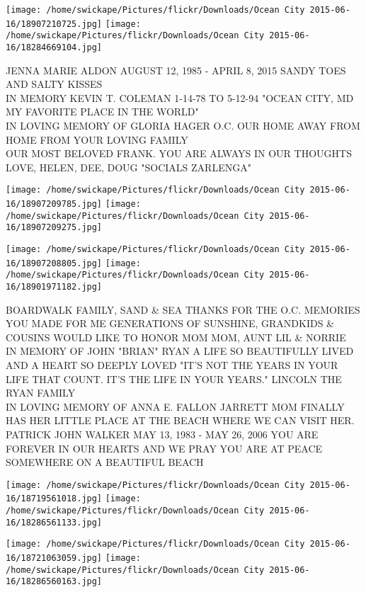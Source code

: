 \documentclass[10pt,letterpaper]{article}
\begin{document}
\texttt{[image: /home/swickape/Pictures/flickr/Downloads/Ocean City 2015-06-16/18907210725.jpg]}
\texttt{[image: /home/swickape/Pictures/flickr/Downloads/Ocean City 2015-06-16/18284669104.jpg]}

JENNA MARIE ALDON AUGUST 12, 1985 {-} APRIL 8, 2015 SANDY TOES AND SALTY KISSES\\
IN MEMORY KEVIN T. COLEMAN 1{-}14{-}78 TO 5{-}12{-}94 "OCEAN CITY, MD MY FAVORITE PLACE IN THE WORLD"\\
IN LOVING MEMORY OF GLORIA HAGER O.C. OUR HOME AWAY FROM HOME FROM YOUR LOVING FAMILY\\
OUR MOST BELOVED FRANK.  YOU ARE ALWAYS IN OUR THOUGHTS LOVE, HELEN, DEE, DOUG "SOCIALS ZARLENGA"\\
\pagebreak

\texttt{[image: /home/swickape/Pictures/flickr/Downloads/Ocean City 2015-06-16/18907209785.jpg]}
\texttt{[image: /home/swickape/Pictures/flickr/Downloads/Ocean City 2015-06-16/18907209275.jpg]}

\texttt{[image: /home/swickape/Pictures/flickr/Downloads/Ocean City 2015-06-16/18907208805.jpg]}
\texttt{[image: /home/swickape/Pictures/flickr/Downloads/Ocean City 2015-06-16/18901971182.jpg]}

BOARDWALK FAMILY, SAND \& SEA THANKS FOR THE O.C. MEMORIES YOU MADE FOR ME GENERATIONS OF SUNSHINE, GRANDKIDS \& COUSINS WOULD LIKE TO HONOR MOM MOM, AUNT LIL \& NORRIE\\
IN MEMORY OF JOHN "BRIAN" RYAN A LIFE SO BEAUTIFULLY LIVED AND A HEART SO DEEPLY LOVED "IT'S NOT THE YEARS IN YOUR LIFE THAT COUNT.  IT'S THE LIFE IN YOUR YEARS."  LINCOLN THE RYAN FAMILY\\
IN LOVING MEMORY OF ANNA E. FALLON JARRETT MOM FINALLY HAS HER LITTLE PLACE AT THE BEACH WHERE WE CAN VISIT HER.\\
PATRICK JOHN WALKER MAY 13, 1983 {-} MAY 26, 2006 YOU ARE FOREVER IN OUR HEARTS AND WE PRAY YOU ARE AT PEACE SOMEWHERE ON A BEAUTIFUL BEACH\\
\pagebreak

\texttt{[image: /home/swickape/Pictures/flickr/Downloads/Ocean City 2015-06-16/18719561018.jpg]}
\texttt{[image: /home/swickape/Pictures/flickr/Downloads/Ocean City 2015-06-16/18286561133.jpg]}

\texttt{[image: /home/swickape/Pictures/flickr/Downloads/Ocean City 2015-06-16/18721063059.jpg]}
\texttt{[image: /home/swickape/Pictures/flickr/Downloads/Ocean City 2015-06-16/18286560163.jpg]}
\end{document}
